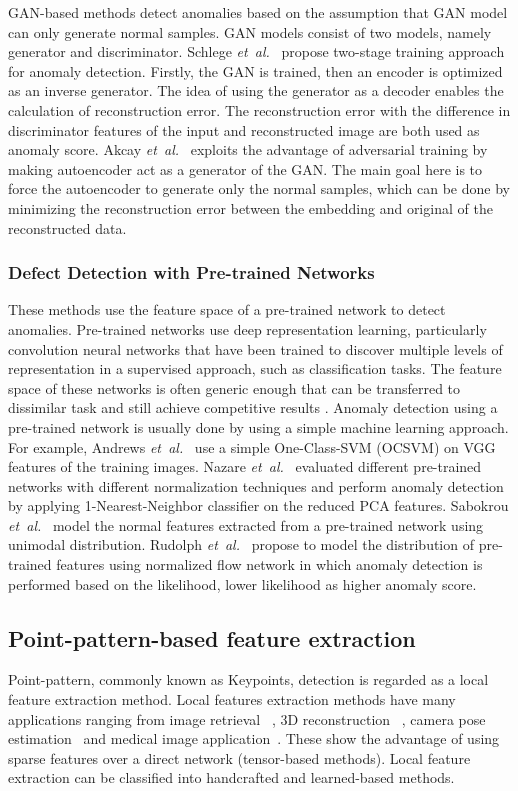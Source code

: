 \documentclass[journal]{IEEEtran}
\newcommand \andothers {\textit{et~al.}}
\begin{document}
GAN-based methods detect anomalies based on the assumption that GAN model can only generate normal samples.  GAN models consist of two models, namely generator and discriminator. Schlege \andothers~\cite{schlegl2019f} propose two-stage training approach for anomaly detection. Firstly, the GAN is trained, then  an encoder is optimized as an inverse generator. The idea of using the generator as a decoder enables the calculation of reconstruction error. The reconstruction error with the difference in discriminator features of the input and reconstructed image are both used as anomaly score. Akcay \andothers~\cite{akcay2018ganomaly} exploits the advantage of adversarial training by making autoencoder act as a generator of the GAN. The main goal here is to force the autoencoder to generate only the normal samples, which can be done by minimizing the reconstruction error between the embedding and original of the reconstructed data.

\subsubsection{Defect Detection with Pre-trained Networks}
These methods use the feature space of a pre-trained network to detect anomalies. Pre-trained networks use deep representation learning, particularly convolution neural networks that have been trained to discover multiple levels of representation in a supervised approach, such as classification tasks. The feature space of these networks is often generic enough that can be transferred to dissimilar task and still achieve competitive results \cite{donahuedeep}.  Anomaly detection using a pre-trained network is usually done by using a simple machine learning approach.  For example, Andrews \andothers~\cite{andrews2016transfer} use a simple One-Class-SVM (OCSVM) on VGG~\cite{simonyan2014very} features of the training images. Nazare \andothers~\cite{nazare2018pre} evaluated different pre-trained networks with different normalization techniques and perform anomaly detection by applying 1-Nearest-Neighbor classifier on the reduced PCA features. Sabokrou \andothers~\cite{sabokrou2018deep} model the normal features extracted from a pre-trained network using unimodal distribution. Rudolph \andothers~\cite{rudolph2021same} propose to model the distribution of pre-trained features using normalized flow network in which anomaly detection is performed based on the likelihood, lower likelihood as higher anomaly score.
\subsection{Point-pattern-based feature extraction}
Point-pattern, commonly known as Keypoints, detection is regarded as a local feature extraction method. Local features extraction methods have many applications ranging from image retrieval~\cite{teichmann2019detect} , 3D reconstruction~\cite{schonberger2016structure} , camera pose estimation~\cite{sattler2019understanding} and medical image application~\cite{busam2018markerless}. These show the advantage of using sparse features over a direct network (tensor-based methods). Local feature extraction can be classified into handcrafted and learned-based methods.
\end{document}

